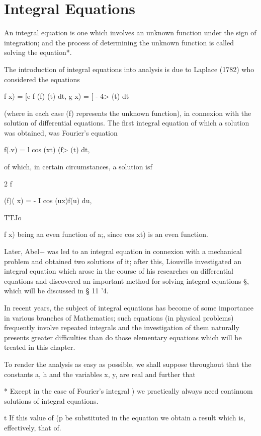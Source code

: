 \chapter{Integral Equations} 


An integral equation is one which involves an unknown function under
the sign of integration; and the process of determining the unknown
function is called solving the equation*.

The introduction of integral equations into analysis is due to Laplace
(1782) who considered the equations

f x) = [e f (f) (t) dt, g x) = [ - 4> (t) dt

(where in each case (f) represents the unknown function), in connexion
with the solution of differential equations. The first integral
equation of which a solution was obtained, was Fourier's equation

f(.v) = l cos (xt) (f> (t) dt,

of which, in certain circumstances, a solution isf

2 f

(f)( x) = - I cos (ux)f(u) du,

TTJo

f x) being an even function of a;, since cos xt) is an even function.

Later, Abel+ was led to an integral equation in connexion with a
mechanical problem and obtained two solutions of it; after this,
Liouville investigated an integral equation which arose in the course
of his researches on differential equations and discovered an
important method for solving integral equations §, which will be
discussed in § 11 '4.

In recent years, the subject of integral equations has become of some
importance in various branches of Mathematics; such equations (in
physical problems) frequently involve repeated integrals and the
investigation of them naturally presents greater difficulties than do
those elementary equations which will be treated in this chapter.

To render the analysis as easy as possible, we shall suppose
throughout that the constants a, h and the variables x, y, are real
and further that

* Except in the case of Fourier's integral ) we practically
always need continuom solutions of integral equations.

t If this value of (p be substituted in the equation we obtain a
result which is, effectively, that of.

